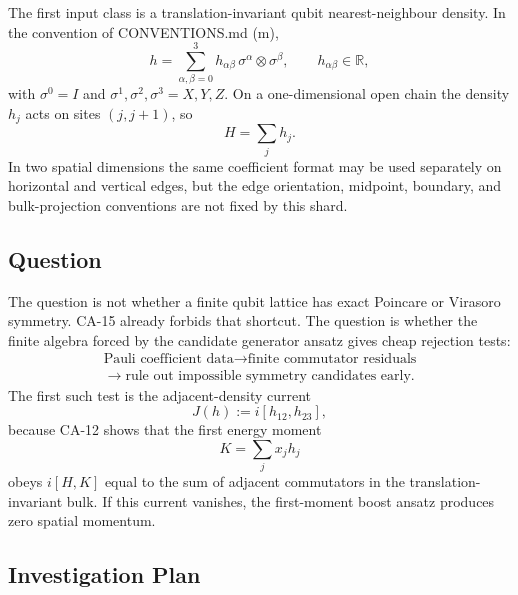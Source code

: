 The first input class is a translation-invariant qubit nearest-neighbour
density.  In the convention of CONVENTIONS.md (m),
\[
  h=\sum_{\alpha,\beta=0}^3
    h_{\alpha\beta}\,\sigma^\alpha\otimes\sigma^\beta,
  \qquad h_{\alpha\beta}\in\mathbb R,
\]
with \(\sigma^0=I\) and \(\sigma^1,\sigma^2,\sigma^3=X,Y,Z\).  On a
one-dimensional open chain the density \(h_j\) acts on sites \((j,j+1)\), so
\[
  H=\sum_j h_j.
\]
In two spatial dimensions the same coefficient format may be used separately
on horizontal and vertical edges, but the edge orientation, midpoint, boundary,
and bulk-projection conventions are not fixed by this shard.

\subsection{Question}

The question is not whether a finite qubit lattice has exact Poincare or
Virasoro symmetry.  CA-15 already forbids that shortcut.  The question is
whether the finite algebra forced by the candidate generator ansatz gives
cheap rejection tests:
\[
  \begin{array}{c}
  \text{Pauli coefficient data}
  \longrightarrow
  \text{finite commutator residuals}\\
  \longrightarrow
  \text{rule out impossible symmetry candidates early}.
  \end{array}
\]
The first such test is the adjacent-density current
\[
  J(h):=i[h_{12},h_{23}],
\]
because CA-12 shows that the first energy moment
\[
  K=\sum_j x_j h_j
\]
obeys \(i[H,K]\) equal to the sum of adjacent commutators in the
translation-invariant bulk.  If this current vanishes, the first-moment boost
ansatz produces zero spatial momentum.

\subsection{Investigation Plan}

